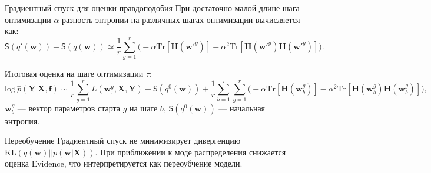 \documentclass[10pt,pdf,utf8,russian,aspectratio=169]{beamer}
\begin{document}
\begin{frame}{Градиентный спуск для оценки правдоподобия}
При достаточно малой длине шага оптимизации $\alpha$ разность энтропии на различных шагах оптимизации вычисляется как:
\[
\mathsf{S}(q'(\mathbf{w})) -  \mathsf{S}(q(\mathbf{w}))  \simeq  \frac{1}{r}\sum_{g=1}^r \bigl(-\alpha \text{Tr}[\mathbf{H}(\mathbf{w}'^g)] - \alpha^2 \text{Tr}[\mathbf{H}(\mathbf{w}'^g)\mathbf{H}(\mathbf{w}'^g)]  \bigr).
\]

Итоговая оценка на шаге оптимизации $\tau$:
$$
\text{log}~\hat{p}(\mathbf{Y}|\mathbf{X}, \mathbf{f}) \sim \frac{1}{r} \sum_{g = 1}^r L(\mathbf{w}^g_\tau, \mathbf{X}, \mathbf{Y})  + \mathsf{S}(q^0(\mathbf{w})) + \frac{1}{r}\sum_{b=1}^\tau\sum_{g=1}^r \bigl(-\alpha \text{Tr}[\mathbf{H}(\mathbf{w}_b^g)] - \alpha^2 \text{Tr}[\mathbf{H}(\mathbf{w}_b^g)\mathbf{H}(\mathbf{w}_b^g)]  \bigr),
$$
$\mathbf{w}_b^g$ --- вектор параметров старта $g$ на шаге $b$, $\mathsf{S}(q^0(\mathbf{w}))$ --- начальная энтропия.
\end{frame}
\begin{frame}{Переобучение}
Градиентный спуск не минимизирует дивергенцию $\text{KL}(q(\mathbf{w})||p(\mathbf{w}| \mathbf{X}))$. При приближении к моде распределения снижается оценка Evidence, что интерпретируется как переоубчение модели.

\begin{figure}
  \centering
\label{fig:1}\qquad
\end{figure}
\end{frame}
\end{document}
